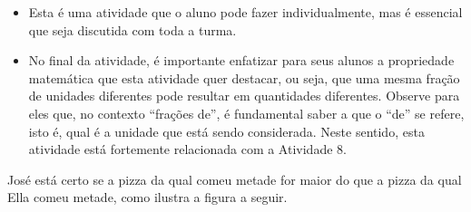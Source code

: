 \begin{multicols}{2}
\begin{orientacoes}
  \begin{itemize} %
    \item       Esta é uma atividade que o aluno pode fazer individualmente, mas é essencial que seja discutida com toda a turma.
    \item       No final da atividade, é importante enfatizar para seus alunos a propriedade matemática que esta atividade quer destacar, ou seja, que uma mesma fração de unidades diferentes pode resultar em quantidades diferentes. Observe para eles que, no contexto       ``frações de'', é fundamental saber a que o       ``de''     se refere, isto é, qual é a unidade que está sendo considerada. Neste sentido, esta atividade está fortemente relacionada com a Atividade 8.
\end{itemize} %


\end{orientacoes}

\begin{solucao}{}{}
  José está certo se a pizza da qual comeu metade for maior do que a pizza da qual Ella comeu metade, como ilustra a figura a seguir.
  \begin{center}

  \end{center}

  \end{solucao}




\end{multicols}
